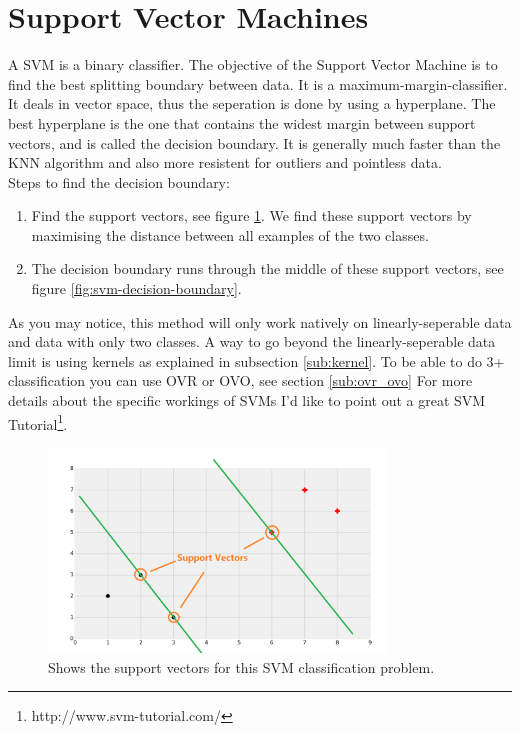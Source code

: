 \section{Support Vector Machines}
A SVM is a binary classifier. The objective of the Support Vector Machine is to find the best splitting boundary between data. It is a maximum-margin-classifier. It deals in vector space, thus the seperation is done by using a hyperplane. The best hyperplane is the one that contains the widest margin between support vectors, and is called the decision boundary. It is generally much faster than the KNN algorithm and also more resistent for outliers and pointless data.
\\
\noindent Steps to find the decision boundary:
\begin{enumerate}
\item Find the support vectors, see figure \ref{fig:svm-support-vectors}. We find these support vectors by maximising the distance between all examples of the two classes.
\item The decision boundary runs through the middle of these support vectors, see figure \ref{fig:svm-decision-boundary}.
\end{enumerate}

\noindent As you may notice, this method will only work natively on linearly-seperable data and data with only two classes. A way to go beyond the linearly-seperable data limit is using kernels as explained in subsection \ref{sub:kernel}. To be able to do 3+ classification you can use OVR or OVO, see section \ref{sub:ovr_ovo} For more details about the specific workings of SVMs I'd like to point out a great SVM Tutorial\footnote{http://www.svm-tutorial.com/}.


\begin{figure}
\centering
\includegraphics[width=0.8\textwidth]{images/svm-support-vectors.png}
\caption{\label{fig:svm-support-vectors} Shows the support vectors for this SVM classification problem.}
\end{figure}

